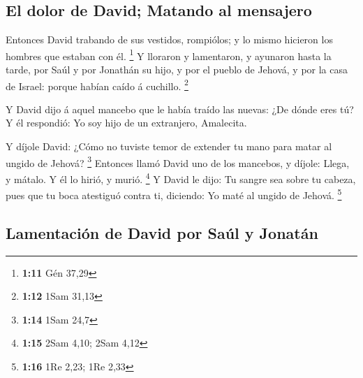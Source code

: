 \hypertarget{el-dolor-de-david-matando-al-mensajero}{%
\subsection{El dolor de David; Matando al
mensajero}\label{el-dolor-de-david-matando-al-mensajero}}

 Entonces David trabando de sus vestidos, rompiólos; y lo
mismo hicieron los hombres que estaban con él. \footnote{\textbf{1:11}
  Gén 37,29}  Y lloraron y lamentaron, y ayunaron hasta
la tarde, por Saúl y por Jonathán su hijo, y por el pueblo de Jehová, y
por la casa de Israel: porque habían caído á cuchillo. \footnote{\textbf{1:12}
  1Sam 31,13}

 Y David dijo á aquel mancebo que le había traído las
nuevas: ¿De dónde eres tú? Y él respondió: Yo soy hijo de un extranjero,
Amalecita.

 Y díjole David: ¿Cómo no tuviste temor de extender tu
mano para matar al ungido de Jehová? \footnote{\textbf{1:14} 1Sam 24,7}
 Entonces llamó David uno de los mancebos, y díjole:
Llega, y mátalo. Y él lo hirió, y murió. \footnote{\textbf{1:15} 2Sam
  4,10; 2Sam 4,12}  Y David le dijo: Tu sangre sea sobre
tu cabeza, pues que tu boca atestiguó contra ti, diciendo: Yo maté al
ungido de Jehová. \footnote{\textbf{1:16} 1Re 2,23; 1Re 2,33}

\hypertarget{lamentaciuxf3n-de-david-por-sauxfal-y-jonatuxe1n}{%
\subsection{Lamentación de David por Saúl y
Jonatán}\label{lamentaciuxf3n-de-david-por-sauxfal-y-jonatuxe1n}}

